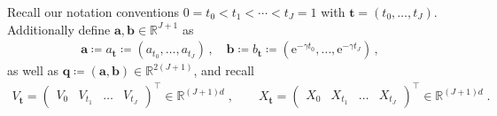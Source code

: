 \documentclass[12pt]{article}
\theoremstyle{plain}
\theoremstyle{plain}
\theoremstyle{remark}
\newcommand{\R}{\mathbb{R}}
\newcommand{\rme}{\mathrm{e}}
\newcommand*{\defeq}{\coloneqq}
\def\eqsp{\;}
\def\eqsp{\;}
\newcommand{\1}{\bm{1}}
\theoremstyle{plain}
\theoremstyle{definition}
\theoremstyle{remark}
\begin{document}
Recall our notation conventions $0=t_0<t_1<\cdots<t_J= 1$ with $\bm{t} = (t_0,\ldots,t_J)$. Additionally define $\bm a, \bm b \in \R^{J+1}$ as
\begin{align*}
    \bm a \defeq a_{\bm t} \defeq (a_{t_0}, \ldots, a_{t_J}) \,, \quad
    \bm b \defeq b_{\bm t} \defeq (\rme^{-\gamma t_0}, \ldots, \rme^{-\gamma t_J})\,,
\end{align*}
as well as $\bm q \defeq (\bm a,\bm b) \in \R^{2(J+1)}$, and recall 
\begin{align*}
V_{\bm{t}}
=
\begin{pmatrix}
V_0&
V_{t_1}&
\hdots&
V_{t_J}
\end{pmatrix}^{\top}
\in\mathbb R^{(J+1)d}\eqsp,
\qquad
X_{\bm{t}}
=
\begin{pmatrix}
X_{0}&
X_{t_1}&
\hdots&
X_{t_J}
\end{pmatrix}^{\top}
\in\mathbb R^{(J+1)d}\eqsp.
\end{align*}
\end{document}
